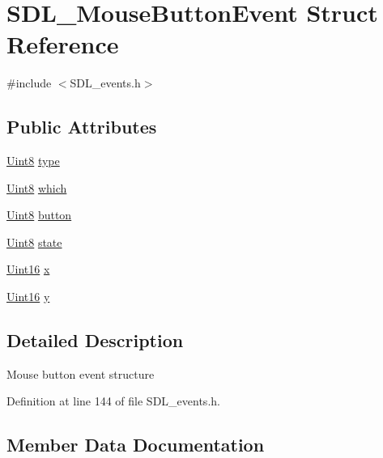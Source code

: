 \hypertarget{struct_s_d_l___mouse_button_event}{}\section{S\+D\+L\+\_\+\+Mouse\+Button\+Event Struct Reference}
\label{struct_s_d_l___mouse_button_event}


{\ttfamily \#include $<$S\+D\+L\+\_\+events.\+h$>$}

\subsection*{Public Attributes}
\begin{DoxyCompactItemize}
\item 
\hyperlink{_s_d_l__stdinc_8h_a2944638813a090aa23e62f4da842c3e2}{Uint8} \hyperlink{struct_s_d_l___mouse_button_event_a529beaceaf87d55792af53fa48d34c4b}{type}
\item 
\hyperlink{_s_d_l__stdinc_8h_a2944638813a090aa23e62f4da842c3e2}{Uint8} \hyperlink{struct_s_d_l___mouse_button_event_af8fca7f59b8a6e3eeab6b54c494e58b7}{which}
\item 
\hyperlink{_s_d_l__stdinc_8h_a2944638813a090aa23e62f4da842c3e2}{Uint8} \hyperlink{struct_s_d_l___mouse_button_event_a1a4680e19ae06d02d2093f0bcba1b24c}{button}
\item 
\hyperlink{_s_d_l__stdinc_8h_a2944638813a090aa23e62f4da842c3e2}{Uint8} \hyperlink{struct_s_d_l___mouse_button_event_a8809cef85cfffad4f2059f2ba4fc6a3d}{state}
\item 
\hyperlink{_s_d_l__stdinc_8h_a31fcc0a076c9068668173ee26d33e42b}{Uint16} \hyperlink{struct_s_d_l___mouse_button_event_a6956f6083abfbcc0052f9483fa1c5ffd}{x}
\item 
\hyperlink{_s_d_l__stdinc_8h_a31fcc0a076c9068668173ee26d33e42b}{Uint16} \hyperlink{struct_s_d_l___mouse_button_event_ae22a30e4b491a0cac67dd72d22fdbf80}{y}
\end{DoxyCompactItemize}


\subsection{Detailed Description}
Mouse button event structure 

Definition at line 144 of file S\+D\+L\+\_\+events.\+h.



\subsection{Member Data Documentation}
\hypertarget{struct_s_d_l___mouse_button_event_a1a4680e19ae06d02d2093f0bcba1b24c}{}
